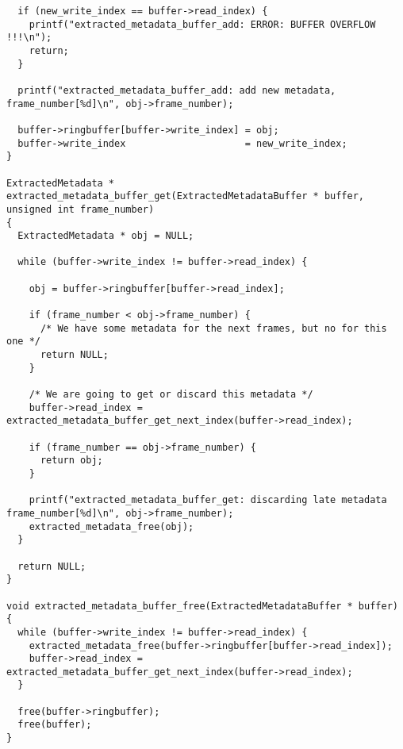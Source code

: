 \begin{lstlisting}
  if (new_write_index == buffer->read_index) {
    printf("extracted_metadata_buffer_add: ERROR: BUFFER OVERFLOW !!!\n");
    return;
  }

  printf("extracted_metadata_buffer_add: add new metadata, frame_number[%d]\n", obj->frame_number);

  buffer->ringbuffer[buffer->write_index] = obj;
  buffer->write_index                     = new_write_index;
}

ExtractedMetadata * extracted_metadata_buffer_get(ExtractedMetadataBuffer * buffer, unsigned int frame_number)
{
  ExtractedMetadata * obj = NULL;

  while (buffer->write_index != buffer->read_index) {

    obj = buffer->ringbuffer[buffer->read_index];

    if (frame_number < obj->frame_number) {
      /* We have some metadata for the next frames, but no for this one */
      return NULL;
    }
 
    /* We are going to get or discard this metadata */
    buffer->read_index = extracted_metadata_buffer_get_next_index(buffer->read_index);

    if (frame_number == obj->frame_number) {
      return obj;
    }

    printf("extracted_metadata_buffer_get: discarding late metadata frame_number[%d]\n", obj->frame_number);    
    extracted_metadata_free(obj);
  }

  return NULL;
}

void extracted_metadata_buffer_free(ExtractedMetadataBuffer * buffer)
{
  while (buffer->write_index != buffer->read_index) {
    extracted_metadata_free(buffer->ringbuffer[buffer->read_index]);
    buffer->read_index = extracted_metadata_buffer_get_next_index(buffer->read_index);
  }

  free(buffer->ringbuffer);
  free(buffer);
}


\end{lstlisting}
